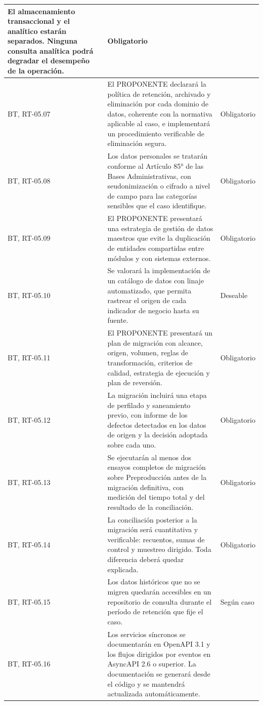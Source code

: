 \begin{longtable}{|L{0.098425\AnchoTablaAnexo}|L{0.814961\AnchoTablaAnexo}|L{0.086614\AnchoTablaAnexo}|}
El almacenamiento transaccional y el analítico estarán separados. Ninguna consulta analítica podrá degradar el desempeño de la operación. &
Obligatorio \\ \hline
BT, RT-05.07 &
El PROPONENTE declarará la política de retención, archivado y eliminación por cada dominio de datos, coherente con la normativa aplicable al caso, e implementará un procedimiento verificable de eliminación segura. &
Obligatorio \\ \hline
{}
BT, RT-05.08 &
Los datos personales se tratarán conforme al Artículo 85° de las Bases Administrativas, con seudonimización o cifrado a nivel de campo para las categorías sensibles que el caso identifique. &
Obligatorio \\ \hline
BT, RT-05.09 &
El PROPONENTE presentará una estrategia de gestión de datos maestros que evite la duplicación de entidades compartidas entre módulos y con sistemas externos. &
Obligatorio \\ \hline
{}
BT, RT-05.10 &
Se valorará la implementación de un catálogo de datos con linaje automatizado, que permita rastrear el origen de cada indicador de negocio hasta su fuente. &
Deseable \\ \hline
BT, RT-05.11 &
El PROPONENTE presentará un plan de migración con alcance, origen, volumen, reglas de transformación, criterios de calidad, estrategia de ejecución y plan de reversión. &
Obligatorio \\ \hline
{}
BT, RT-05.12 &
La migración incluirá una etapa de perfilado y saneamiento previo, con informe de los defectos detectados en los datos de origen y la decisión adoptada sobre cada uno. &
Obligatorio \\ \hline
BT, RT-05.13 &
Se ejecutarán al menos dos ensayos completos de migración sobre Preproducción antes de la migración definitiva, con medición del tiempo total y del resultado de la conciliación. &
Obligatorio \\ \hline
{}
BT, RT-05.14 &
La conciliación posterior a la migración será cuantitativa y verificable: recuentos, sumas de control y muestreo dirigido. Toda diferencia deberá quedar explicada. &
Obligatorio \\ \hline
BT, RT-05.15 &
Los datos históricos que no se migren quedarán accesibles en un repositorio de consulta durante el período de retención que fije el caso. &
Según caso \\ \hline
{}
BT, RT-05.16 &
Los servicios síncronos se documentarán en OpenAPI 3.1 y los flujos dirigidos por eventos en AsyncAPI 2.6 o superior. La documentación se generará desde el código y se mantendrá actualizada automáticamente. &

\end{longtable}

